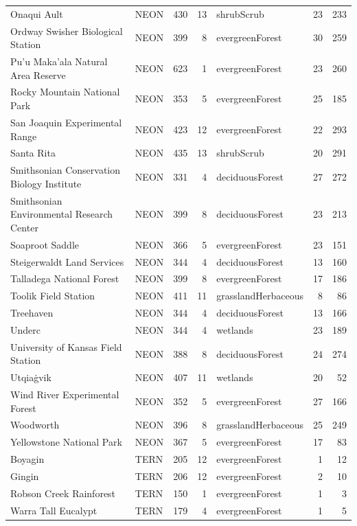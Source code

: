 \begin{tabular}{llrrlrr}
Onaqui Ault & NEON & 430 & 13 & shrubScrub & 23 & 233 \\
Ordway Swisher Biological Station & NEON & 399 & 8 & evergreenForest & 30 & 259 \\
Pu'u Maka'ala Natural Area Reserve & NEON & 623 & 1 & evergreenForest & 23 & 260 \\
Rocky Mountain National Park & NEON & 353 & 5 & evergreenForest & 25 & 185 \\
San Joaquin Experimental Range & NEON & 423 & 12 & evergreenForest & 22 & 293 \\
Santa Rita & NEON & 435 & 13 & shrubScrub & 20 & 291 \\
Smithsonian Conservation Biology Institute & NEON & 331 & 4 & deciduousForest & 27 & 272 \\
Smithsonian Environmental Research Center & NEON & 399 & 8 & deciduousForest & 23 & 213 \\
Soaproot Saddle & NEON & 366 & 5 & evergreenForest & 23 & 151 \\
Steigerwaldt Land Services & NEON & 344 & 4 & deciduousForest & 13 & 160 \\
Talladega National Forest & NEON & 399 & 8 & evergreenForest & 17 & 186 \\
Toolik Field Station & NEON & 411 & 11 & grasslandHerbaceous & 8 & 86 \\
Treehaven & NEON & 344 & 4 & deciduousForest & 13 & 166 \\
Underc & NEON & 344 & 4 & wetlands & 23 & 189 \\
University of Kansas Field Station & NEON & 388 & 8 & deciduousForest & 24 & 274 \\
Utqiaġvik & NEON & 407 & 11 & wetlands & 20 & 52 \\
Wind River Experimental Forest & NEON & 352 & 5 & evergreenForest & 27 & 166 \\
Woodworth & NEON & 396 & 8 & grasslandHerbaceous & 25 & 249 \\
Yellowstone National Park & NEON & 367 & 5 & evergreenForest & 17 & 83 \\
Boyagin & TERN & 205 & 12 & evergreenForest & 1 & 12 \\
Gingin & TERN & 206 & 12 & evergreenForest & 2 & 10 \\
Robson Creek Rainforest & TERN & 150 & 1 & evergreenForest & 1 & 3 \\
Warra Tall Eucalypt & TERN & 179 & 4 & evergreenForest & 1 & 5 \\
\bottomrule
\end{tabular}
